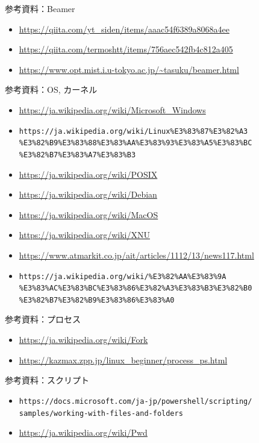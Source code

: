 \documentclass[12pt,aspectratio=169]{beamer}
\begin{document}
\begin{frame}{参考資料：Beamer}
  \begin{itemize}
    \item \url { https://qiita.com/yt_siden/items/aaac54f6389a8068a4ee }
    \item \url { https://qiita.com/termoshtt/items/756aec542fb4c812a405 }
    \item \url { https://www.opt.mist.i.u-tokyo.ac.jp/~tasuku/beamer.html }
  \end{itemize}

\end{frame}


\begin{frame}{参考資料：OS, カーネル}
  \begin{itemize}
    \item \url { https://ja.wikipedia.org/wiki/Microsoft_Windows }
    \item \texttt {https://ja.wikipedia.org/wiki/Linux\%E3\%83\%87\%E3\%82\%A3 \\ \%E3\%82\%B9\%E3\%83\%88\%E3\%83\%AA\%E3\%83\%93\%E3\%83\%A5\%E3\%83\%BC \\ \%E3\%82\%B7\%E3\%83\%A7\%E3\%83\%B3 }
    \item \url { https://ja.wikipedia.org/wiki/POSIX }
    \item \url { https://ja.wikipedia.org/wiki/Debian }
    \item \url { https://ja.wikipedia.org/wiki/MacOS }
    \item \url { https://ja.wikipedia.org/wiki/XNU }
    \item \url { https://www.atmarkit.co.jp/ait/articles/1112/13/news117.html }
    \item \texttt {https://ja.wikipedia.org/wiki/\%E3\%82\%AA\%E3\%83\%9A \\ \%E3\%83\%AC\%E3\%83\%BC\%E3\%83\%86\%E3\%82\%A3\%E3\%83\%B3\%E3\%82\%B0 \\ \%E3\%82\%B7\%E3\%82\%B9\%E3\%83\%86\%E3\%83\%A0 }
  \end{itemize}

\end{frame}


\begin{frame}{参考資料：プロセス}
  \begin{itemize}
    \item \url { https://ja.wikipedia.org/wiki/Fork }
    \item \url { https://kazmax.zpp.jp/linux_beginner/process_ps.html }
  \end{itemize}

\end{frame}


\begin{frame}{参考資料：スクリプト}
  \begin{itemize}
    \item \texttt {https://docs.microsoft.com/ja-jp/powershell/scripting/\\ samples/working-with-files-and-folders }
    \item \url { https://ja.wikipedia.org/wiki/Pwd }
  \end{itemize}

\end{frame}
\end{document}
